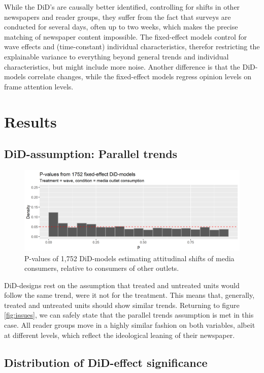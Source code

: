 \documentclass{article}
\begin{document}
While the DiD's are causally better identified, controlling for shifts in other newspapers and reader groups, they suffer from the fact that surveys are conducted for several days, often up to two weeks, which makes the precise matching of newspaper content impossible. The fixed-effect models control for wave effects and (time-constant) individual characteristics, therefor restricting the explainable variance to everything beyond general trends and individual characteristics, but might include more noise. Another difference is that the DiD-models correlate changes, while the fixed-effect models regress opinion levels on frame attention levels.


\section{Results}

\subsection{DiD-assumption: Parallel trends}

\begin{figure}[!ht]
    \centering
    \includegraphics[width=\textwidth]{paper/vis/DiD_model_ps_notheory.png}
    \caption{P-values of 1,752 DiD-models estimating attitudinal shifts of media consumers, relative to consumers of other outlets.}
    \label{fig:p_values}
\end{figure}

DiD-designs rest on the assumption that treated and untreated units would follow the same trend, were it not for the treatment. This means that, generally, treated and untreated units should show similar trends. Returning to figure \ref{fig:issues}, we can safely state that the parallel trends assumption is met in this case. All reader groups move in a highly similar fashion on both variables, albeit at different levels, which reflect the ideological leaning of their newspaper.

\subsection{Distribution of DiD-effect significance}
\end{document}
